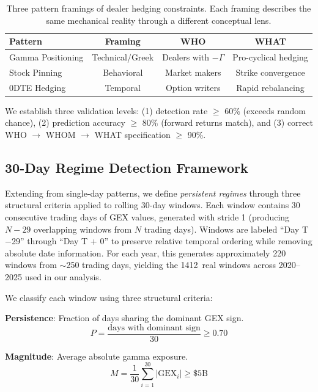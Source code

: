 \documentclass[jrfm,article,accept,moreauthors,pdftex]{Definitions/mdpi}
\begin{document}
\begin{table}[H]
\centering
\caption{Three pattern framings of dealer hedging constraints. Each framing describes the same mechanical reality through a different conceptual lens.}
\label{tab:patterns}
\begin{tabularx}{\textwidth}{lCCc}
\toprule
\textbf{Pattern} & \textbf{Framing} & \textbf{WHO} & \textbf{WHAT} \\
\midrule
Gamma Positioning & Technical/Greek & Dealers with $-\Gamma$ & Pro-cyclical hedging \\
Stock Pinning & Behavioral & Market makers & Strike convergence \\
0DTE Hedging & Temporal & Option writers & Rapid rebalancing \\
\bottomrule
\end{tabularx}
\end{table}

We establish three validation levels: (1) detection rate $\geq$ 60\% (exceeds random chance), (2) prediction accuracy $\geq$ 80\% (forward returns match), and (3) correct WHO $\rightarrow$ WHOM $\rightarrow$ WHAT specification $\geq$ 90\%.

\subsection{30-Day Regime Detection Framework}
\label{subsec:regime_method}

Extending from single-day patterns, we define \textit{persistent regimes} through three structural criteria applied to rolling 30-day windows. Each window contains 30 consecutive trading days of GEX values, generated with stride 1 (producing $N - 29$ overlapping windows from $N$ trading days). Windows are labeled ``Day T$-$29'' through ``Day T + 0'' to preserve relative temporal ordering while removing absolute date information. For each year, this generates approximately 220 windows from $\sim$250 trading days, yielding the 1412~real windows across 2020--2025 used in our analysis.

We classify each window using three structural criteria:

\textbf{Persistence}: Fraction of days sharing the dominant GEX sign.
\begin{equation}
P = \frac{\text{days with dominant sign}}{30} \geq 0.70
\end{equation}

\textbf{Magnitude}: Average absolute gamma exposure.
\begin{equation}
M = \frac{1}{30}\sum_{i=1}^{30} |\text{GEX}_i| \geq \$5\text{B}
\end{equation}
\end{document}

